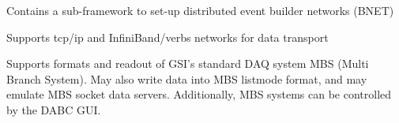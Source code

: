 \item Contains a sub-framework to set-up distributed event builder networks (BNET) 
 
\item Supports tcp/ip and InfiniBand/verbs networks for data transport

\item Supports formats and readout of GSI's standard DAQ system MBS
   (Multi Branch System). May also write data into MBS listmode format,
   and may emulate MBS socket data servers.
   Additionally, MBS systems can be controlled by the DABC GUI.  
\enum

% 
% 
% 

